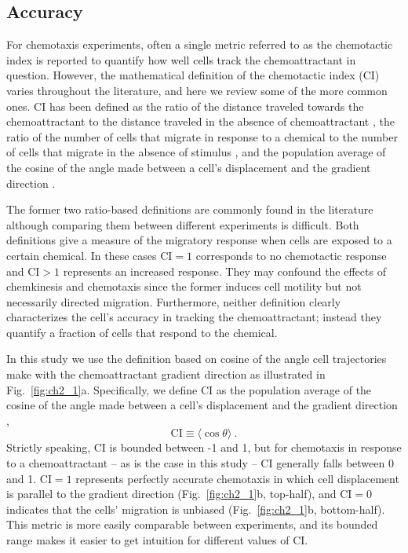 \subsection{Accuracy}

For chemotaxis experiments, often a single metric referred to as the chemotactic index is reported to quantify how well cells track the chemoattractant in question. However, the mathematical definition of the chemotactic index (CI) varies throughout the literature, and here we review some of the more common ones. CI has been defined as the ratio of the distance traveled towards the chemoattractant to the distance traveled in the absence of chemoattractant \cite{nelson1975chemotaxis}, the ratio of the number of cells that migrate in response to a chemical to the number of cells that migrate in the absence of stimulus \cite{iellem2001unique,mayr2002vascular,fiedler2005vegf}, and the population average of the cosine of the angle made between a cell's displacement and the gradient direction
\cite{funamoto2001role,mouneimne2006spatial,van2007biased,kay2008changing}.

The former two ratio-based definitions are commonly found in the literature although comparing them between different experiments is difficult. Both definitions give a measure of the migratory response when cells are exposed to a certain chemical. In these cases $\text{CI} = 1$ corresponds to no chemotactic response and $\text{CI} > 1$ represents an increased response. They may confound the effects of chemkinesis and chemotaxis since the former induces cell motility but not necessarily directed migration. Furthermore, neither definition clearly characterizes the cell's accuracy in tracking the chemoattractant; instead they quantify a fraction of cells that respond to the chemical.

In this study we use the definition based on cosine of the angle cell trajectories make with the chemoattractant gradient direction as illustrated in Fig.\ \ref{fig:ch2_1}a. Specifically, we define CI as the population average of the cosine of the angle made between a cell's displacement and the gradient direction \cite{mouneimne2006spatial,kay2008changing,funamoto2001role},
\begin{equation} \label{eq:defCI}
    \text{CI} \equiv \langle \cos \theta \rangle \ .
\end{equation}
Strictly speaking, CI is bounded between -1 and 1, but for chemotaxis in response to a chemoattractant -- as is the case in this study -- CI generally falls between 0 and 1. $\text{CI} = 1$ represents perfectly accurate chemotaxis in which cell displacement is parallel to the gradient direction (Fig.\ \ref{fig:ch2_1}b, top-half), and $\text{CI} = 0$ indicates that the cells' migration is unbiased (Fig.\ \ref{fig:ch2_1}b, bottom-half). This metric is more easily comparable between experiments, and its bounded range makes it easier to get intuition for different values of CI.

